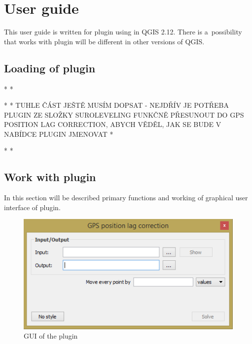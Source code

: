 
\chapter{User guide}
\label{user-guide}

This user guide is written for plugin using in QGIS 2.12. There is a~possibility that works with plugin
will be different in other versions of QGIS. 

\section{Loading of plugin}
\label{plugin-load}

* 
* 

* 
* TUHLE ČÁST JEŠTĚ MUSÍM DOPSAT - NEJDŘÍV JE POTŘEBA PLUGIN ZE SLOŽKY SUROLEVELING FUNKČNĚ PŘESUNOUT DO GPS POSITION LAG CORRECTION, ABYCH VĚDĚL, JAK SE BUDE V NABÍDCE PLUGIN JMENOVAT
*

* 
*

\section{Work with plugin}
\label{work}

In this section will be described primary functions and working of graphical user interface of plugin. 

  \begin{figure}[H]
   \centering
	\includegraphics[scale=0.75]{./pictures/gui.png}
	\caption[GUI]{GUI of the plugin}
      \label{fig:gui}
  \end{figure}

